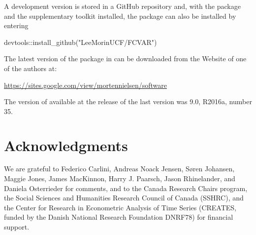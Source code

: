\documentclass[article]{jss}
\begin{document}
A development version is stored in a GitHub repository and, 
with the  package 
and the supplementary toolkit  installed, the 
 package can also be installed by entering 

\begin{Code}
devtools::install_github("LeeMorinUCF/FCVAR")
\end{Code}


The latest version of the  package  in \cite{Nielsen2016} 
can be downloaded from the Website of one of the authors at:
% 
\begin{center} \url{https://sites.google.com/view/mortennielsen/software}
\end{center}
% 
\noindent 
The version of  available at the release of the last version was 
 9.0, R2016a, number 35. 



\section*{Acknowledgments}


We are grateful to Federico Carlini, Andreas Noack Jensen, S\o ren Johansen, Maggie Jones, James MacKinnon, Harry J. Paarsch, Jason Rhinelander, and Daniela Osterrieder for comments, and to the Canada Research Chairs program, the Social Sciences and Humanities Research Council of Canada (SSHRC), and the Center for Research in Econometric Analysis of Time Series (CREATES, funded by the Danish National Research Foundation DNRF78) for financial support.


\end{document}
